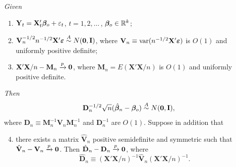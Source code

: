 \begin{theorem}\label{thm:4.25}
\emph{Given}
\begin{enumerate}[label=(\roman*)]
\item $\mathbf{Y}_t = \mathbf{X}_t'\boldsymbol{\beta}_o + \varepsilon_t$, \quad $t = 1, 2, \ldots$\,, $\boldsymbol{\beta}_o \in \mathbb{R}^k$;
\item $\mathbf{V}_n^{-1/2}n^{-1/2}\mathbf{X}'\boldsymbol{\varepsilon} \overset{A}{\sim} N(\mathbf{0}, \mathbf{I})$, where $\mathbf{V}_n \equiv \mathrm{var}(n^{-1/2}\mathbf{X}'\boldsymbol{\varepsilon})$ is $O(1)$ and uniformly positive definite;
\item $\mathbf{X}'\mathbf{X}/n - \mathbf{M}_n \xrightarrow{p} \mathbf{0}$, where $\mathbf{M}_n = E(\mathbf{X}'\mathbf{X}/n)$ is $O(1)$ and uniformly positive definite.
\end{enumerate}
\emph{Then}
\[
\mathbf{D}_n^{-1/2}\sqrt{n}(\hat{\boldsymbol{\beta}}_n - \boldsymbol{\beta}_o) \overset{A}{\sim} N(\mathbf{0}, \mathbf{I}),
\]
where $\mathbf{D}_n \equiv \mathbf{M}_n^{-1}\mathbf{V}_n\mathbf{M}_n^{-1}$ and $\mathbf{D}_n^{-1}$ are $O(1)$. Suppose in addition that
\begin{enumerate}[label=(\roman*)]
\setcounter{enumi}{3}
\item there exists a matrix $\hat{\mathbf{V}}_n$ positive semidefinite and symmetric such that $\hat{\mathbf{V}}_n - \mathbf{V}_n \xrightarrow{p} \mathbf{0}$. Then $\hat{\mathbf{D}}_n - \mathbf{D}_n \xrightarrow{p} \mathbf{0}$, where
\[
\hat{\mathbf{D}}_n \equiv (\mathbf{X}'\mathbf{X}/n)^{-1}\hat{\mathbf{V}}_n(\mathbf{X}'\mathbf{X}/n)^{-1}.
\]
\end{enumerate}
\end{theorem}

